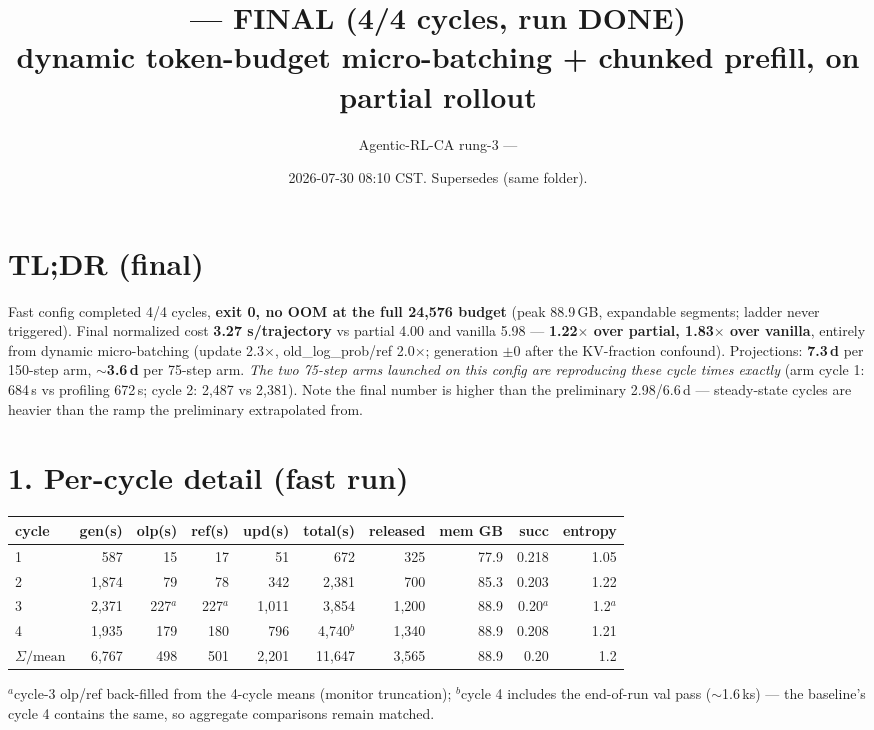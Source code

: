 \documentclass[10pt]{article}
\title{\vspace{-1.4em}\code{p8bprof\_grpo\_fast} --- FINAL (4/4 cycles, run DONE)\\
\large dynamic token-budget micro-batching + chunked prefill, on partial rollout\vspace{-0.5em}}
\author{Agentic-RL-CA rung-3 --- \code{sync-partial-rollout-poc}}
\date{2026-07-30 08:10 CST. Supersedes \code{p8b\_fast\_preliminary.pdf} (same folder).}
\begin{document}
\maketitle\vspace{-1.8em}

\section*{TL;DR (final)}
Fast config completed 4/4 cycles, \textbf{exit 0, no OOM at the full 24{,}576 budget}
(peak 88.9\,GB, expandable segments; ladder never triggered). Final normalized cost
\textbf{3.27 s/trajectory} vs partial 4.00 and vanilla 5.98 --- \textbf{1.22$\times$ over
partial, 1.83$\times$ over vanilla}, entirely from dynamic micro-batching
(update 2.3$\times$, old\_log\_prob/ref 2.0$\times$; generation $\pm$0 after the KV-fraction
confound). Projections: \textbf{7.3\,d} per 150-step arm, \textbf{$\sim$3.6\,d} per 75-step
arm. \emph{The two 75-step arms launched on this config are reproducing these cycle times
exactly} (arm cycle 1: 684\,s vs profiling 672\,s; cycle 2: 2{,}487 vs 2{,}381).
Note the final number is higher than the preliminary 2.98/6.6\,d --- steady-state cycles
are heavier than the ramp the preliminary extrapolated from.

\section*{1. Per-cycle detail (fast run)}
\small
\begin{tabular}{lrrrrrrrrr}
\toprule
cycle & gen(s) & olp(s) & ref(s) & upd(s) & total(s) & released & mem GB & succ & entropy\\
\midrule
1 & 587 & 15 & 17 & 51 & 672 & 325 & 77.9 & 0.218 & 1.05\\
2 & 1{,}874 & 79 & 78 & 342 & 2{,}381 & 700 & 85.3 & 0.203 & 1.22\\
3 & 2{,}371 & 227$^a$ & 227$^a$ & 1{,}011 & 3{,}854 & 1{,}200 & 88.9 & 0.20$^a$ & 1.2$^a$\\
4 & 1{,}935 & 179 & 180 & 796 & 4{,}740$^b$ & 1{,}340 & 88.9 & 0.208 & 1.21\\
\midrule
$\Sigma/\mathrm{mean}$ & 6{,}767 & 498 & 501 & 2{,}201 & 11{,}647 & 3{,}565 & 88.9 & 0.20 & 1.2\\
\bottomrule
\end{tabular}
\normalsize

\noindent$^a$cycle-3 olp/ref back-filled from the 4-cycle means (monitor truncation);
$^b$cycle 4 includes the end-of-run val pass ($\sim$1.6\,ks) --- the baseline's cycle 4
contains the same, so aggregate comparisons remain matched.
\end{document}

